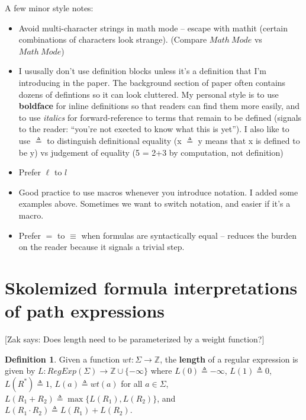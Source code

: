 \documentclass{article}
\newcommand{\regexp}[1]{\mathit{RegExp}(#1)}
\newcommand{\defeq}{\triangleq}
\newcommand{\defn}[1]{\textbf{#1}}
\newcommand{\zak}[1]{{\color{blue}[Zak says: #1]}}
\theoremstyle{definition}
\newtheorem{definition}{Definition}
\begin{document}
A few minor style notes:
\begin{itemize}
\item Avoid multi-character strings in math mode -- escape with mathit
  (certain combinations of characters look strange).  (Compare
  $Math\ Mode$ vs $\mathit{Math\ Mode}$)
\item I ususally don't use definition blocks unless it's a definition
  that I'm introducing in the paper.  The background section of paper
  often contains dozens of defintions so it can look cluttered.  My
  personal style is to use \textbf{boldface} for inline definitions so
  that readers can find them more easily, and to use \emph{italics}
  for forward-reference to terms that remain to be defined (signals to
  the reader: ``you're not exected to know what this is yet'').  I
  also like to use $\defeq$ to distinguish definitional equality (x
  $\defeq$ y means that x is defined to be y) vs judgement of equality
  (5 = 2+3 by computation, not definition)
\item Prefer $\ell$ to $l$
\item Good practice to use macros whenever you introduce notation.  I
  added some examples above.  Sometimes we want to switch notation,
  and easier if it's a macro.
\item Prefer $=$ to $\equiv$ when formulas are syntactically equal --
  reduces the burden on the reader because it signals a trivial step.
\end{itemize}



\section{Skolemized formula interpretations of path expressions}
\zak{Does length need to be parameterized by a weight function?}
\begin{definition}
  Given a function $wt: \Sigma \to \mathbb{Z}$, the \defn{length}
  of a regular expression is given by
  $L: \regexp{\Sigma} \to \mathbb{Z} \cup \{-\infty\}$ where
  $L(0) \defeq -\infty$, $L(1) \defeq 0$, $L(R^*) \defeq 1$,
  $L(a) \defeq wt(a)$ for all $a \in \Sigma$,
  $L(R_1 + R_2) \defeq \max\{L(R_1), L(R_2)\}$, and
  $L(R_1 \cdot R_2) \defeq L(R_1) + L(R_2)$.
\end{definition}
\end{document}
